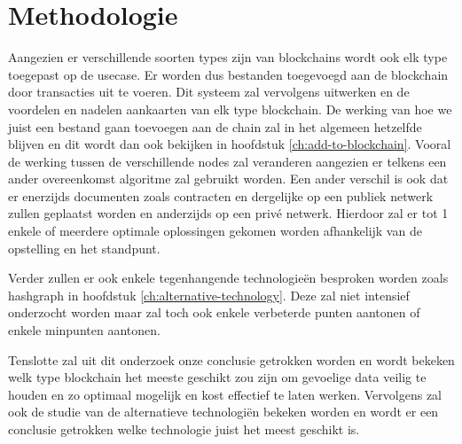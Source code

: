
\chapter{Methodologie}
\label{ch:methodologie}


Aangezien er verschillende soorten types zijn van blockchains wordt ook elk type toegepast op de usecase. Er worden dus bestanden toegevoegd aan de blockchain door transacties uit te voeren. Dit systeem zal vervolgens uitwerken en de voordelen en nadelen aankaarten van elk type blockchain. De werking van hoe we juist een bestand gaan toevoegen aan de chain zal in het algemeen hetzelfde blijven en dit wordt dan ook bekijken in hoofdstuk \ref{ch:add-to-blockchain}. Vooral de werking tussen de verschillende nodes zal veranderen aangezien er telkens een ander overeenkomst algoritme zal gebruikt worden. Een ander verschil is ook dat er enerzijds documenten zoals contracten en dergelijke op een publiek netwerk zullen geplaatst worden en anderzijds op een privé netwerk. Hierdoor zal er tot 1 enkele of meerdere optimale oplossingen gekomen worden afhankelijk van de opstelling en het standpunt.

Verder zullen er ook enkele tegenhangende technologieën besproken worden zoals hashgraph in hoofdstuk \ref{ch:alternative-technology}. Deze zal niet intensief onderzocht worden maar zal toch ook enkele verbeterde punten aantonen of enkele minpunten aantonen. 

Tenslotte zal uit dit onderzoek onze conclusie getrokken worden en wordt bekeken welk type blockchain het meeste geschikt zou zijn om gevoelige data veilig te houden en zo optimaal mogelijk en kost effectief te laten werken. Vervolgens zal  ook de studie van de alternatieve technologiën bekeken worden en wordt er een conclusie getrokken welke technologie juist het meest geschikt is. 




